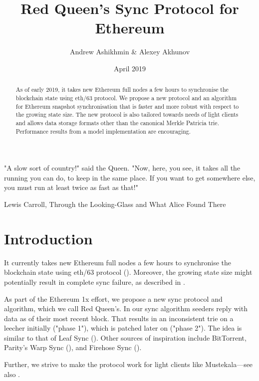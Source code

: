 \documentclass{amsart}
\begin{document}
\pagecolor{white}

\title{Red Queen's Sync Protocol for Ethereum}
\author{Andrew Ashikhmin \& Alexey Akhunov}
\date{April 2019}

\begin{abstract}
    As of early 2019, it takes new Ethereum full nodes a few hours
    to synchronise the blockchain state using eth/63 protocol.
    We propose a new protocol and an algorithm for Ethereum snapshot synchronisation
    that is faster and more robust with respect to the growing state size.
    The new protocol is also tailored towards needs of light clients
    and allows data storage formats other than the canonical Merkle Patricia trie.
    Performance results from a model implementation are encouraging.
\end{abstract}

\maketitle

\epigraph{
    "A slow sort of country!" said the Queen.
    "Now, here, you see, it takes all the running you can do, to keep in the same place.
    If you want to get somewhere else, you must run at least twice as fast as that!"
    }{Lewis Carroll, Through the Looking-Glass and What Alice Found There}

\section{Introduction}

It currently takes new Ethereum full nodes a few hours
to synchronise the blockchain state using eth/63 protocol (\cite{wire_protocol}).
Moreover, the growing state size might potentially result in complete sync failure,
as described in \cite{akhunov_1x_workshop_part1}.

As part of the Ethereum 1x effort, we propose a new sync protocol and algorithm,
which we call Red Queen's.
In our sync algorithm seeders reply with data as of their most recent block.
That results in an inconsistent trie on a leecher initially ("phase 1"),
which is patched later on ("phase 2").
The idea is similar to that of Leaf Sync (\cite{leaf_sync}).
Other sources of inspiration include BitTorrent, Parity's Warp Sync (\cite{warp_sync}),
and Firehose Sync (\cite{firehose}).

Further, we strive to make the protocol work for light clients like Mustekala---see also \cite{light_client_protocol}.
\end{document}
